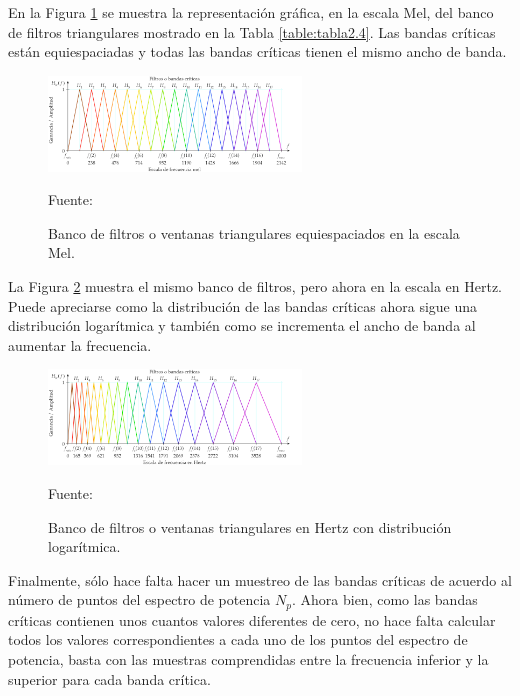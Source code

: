 \begin{enumerate}
\begin{enumerate}
En la Figura \ref{fig:figura2.42} se muestra la representación gráfica, en la escala Mel, del banco de filtros triangulares mostrado en la Tabla \ref{table:tabla2.4}. Las bandas críticas están equiespaciadas y todas las bandas críticas tienen el mismo ancho de banda.
\begin{figure}[H]
\begin{center}
\includegraphics[width=0.6\textwidth]{Imagenes/Cap2/image043}
\end{center}
\begin{center}
\vskip -0.5cm
\caption{\small{Banco de filtros o ventanas triangulares equiespaciados en la escala Mel.}}
\label{fig:figura2.42}
{\small{Fuente: \cite{eyra}}}
\end{center}
\end{figure}
\vskip -0.5cm
La Figura \ref{fig:figura2.43} muestra el mismo banco de filtros, pero ahora en la escala en Hertz. Puede apreciarse como la distribución de las bandas críticas ahora sigue una distribución logarítmica y también como se incrementa el ancho de banda al aumentar la frecuencia.
\begin{figure}[H]
\begin{center}
\includegraphics[width=0.6\textwidth]{Imagenes/Cap2/image044}
\end{center}
\begin{center}
\vskip -0.5cm
\caption{\small{Banco de filtros o ventanas triangulares en Hertz con distribución logarítmica.}}
\label{fig:figura2.43}
{\small{Fuente: \cite{eyra}}}
\end{center}
\end{figure}
\vskip -0.5cm
Finalmente, sólo hace falta hacer un muestreo de las bandas críticas de acuerdo al número de puntos del espectro de potencia $N_{p}.$ Ahora bien, como las bandas críticas contienen unos cuantos valores diferentes de cero, no hace falta calcular todos los valores correspondientes a cada uno de los puntos del espectro de potencia, basta con las muestras comprendidas entre la frecuencia inferior y la superior para cada banda crítica.

\end{enumerate}
\end{enumerate}
